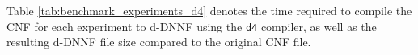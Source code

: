 
Table \ref{tab:benchmark_experiments_d4} denotes the time required to compile the CNF for each experiment to d-DNNF using the \texttt{d4} compiler, as well as the resulting d-DNNF file size compared to the original CNF file.




